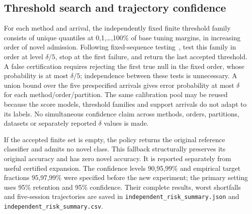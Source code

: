 \documentclass[preprint,review,12pt]{elsarticle}
\begin{document}
\subsection{Threshold search and trajectory confidence}
For each method and arrival, the independently fixed finite threshold family consists of unique quantiles at 0,1,\ldots,100\% of base tuning margins, in increasing order of novel admission. Following fixed-sequence testing~\cite{angelopoulos2021ltt}, test this family in order at level $\delta/5$, stop at the first failure, and return the last accepted threshold. A false certification requires rejecting the first true null in the fixed order, whose probability is at most $\delta/5$; independence between these tests is unnecessary. A union bound over the five prespecified arrivals gives error probability at most $\delta$ for each method/order/partition. The same calibration pool may be reused because the score models, threshold families and support arrivals do not adapt to its labels. No simultaneous confidence claim across methods, orders, partitions, datasets or separately reported $\delta$ values is made.

If the accepted finite set is empty, the policy returns the original reference classifier and admits no novel class. This fallback structurally preserves its original accuracy and has zero novel accuracy. It is reported separately from useful certified expansion. The confidence levels 90,95,99\% and empirical target fractions 95,97,99\% were specified before the new experiment; the primary setting uses 95\% retention and 95\% confidence. Their complete results, worst shortfalls and five-session trajectories are saved in \nolinkurl{independent_risk_summary.json} and \nolinkurl{independent_risk_summary.csv}.

\begin{table}[htbp]
\centering
\caption{ViT-L/14 independent calibration under the original allocation in Section J. All operational means include every partition and base-only fallback; certification counts identify finite accepted thresholds. Section L expands calibration coverage with these score models frozen.}
\resizebox{\linewidth}{!}{}
\end{table}
\begin{table}[htbp]
\centering
\caption{ViT-B/32 independent calibration under the original allocation. Infeasible certification triggers the shared base-only reference fallback and zero novel accuracy.}
\resizebox{\linewidth}{!}{}
\end{table}
\end{document}
